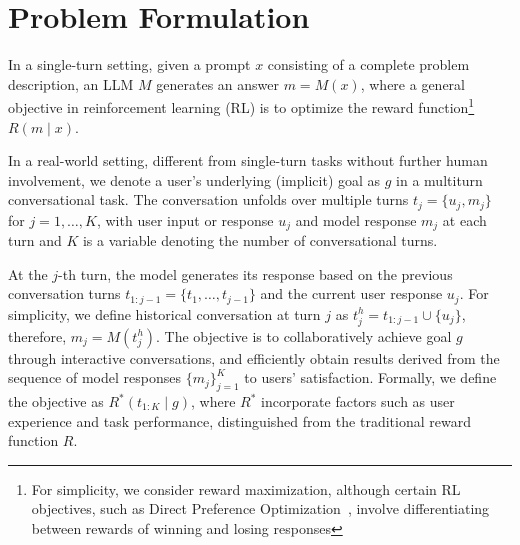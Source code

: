 \section{Problem Formulation}


 In a single-turn setting, given a prompt $x$ consisting of a complete problem description, an LLM $M$ generates an answer $m = M(x)$, where a general objective in reinforcement learning (RL) is to optimize the reward function\footnote{For simplicity, we consider reward maximization, although certain RL objectives, such as Direct Preference Optimization~\citep{dpo}, involve differentiating between rewards of winning and losing responses} $R(m \mid x)$. %



\label{sec:formulation}
In a real-world setting, different from single-turn tasks without further human involvement, we denote a user's underlying (implicit) goal as $g$ in a multiturn conversational task. The conversation unfolds over multiple turns $t_j = \{u_j, m_j\}$ for $j = 1, \dots, K$, with user input or response $u_j$ and model response $m_j$ at each turn and $K$ is a variable denoting the number of conversational turns. 

At the $j$-th turn, the model generates its response based on the previous conversation turns $t_{1:j-1} = \{t_1, \dots, t_{j-1}\}$ and the current user response $u_j$. For simplicity, we define historical conversation at turn $j$ as $t^h_j = t_{1:j-1}\cup \{u_j\}$, therefore, $m_j = M(t^h_j)$. The objective is to collaboratively achieve goal $g$ through interactive conversations, and efficiently obtain results derived from the sequence of model responses $\{m_j\}_{j=1}^{K}$ to users' satisfaction. Formally, we define the objective as $R^*(t_{1:K} \mid g)$, where $R^*$ incorporate factors such as user experience and task performance, distinguished from the traditional reward function $R$.


